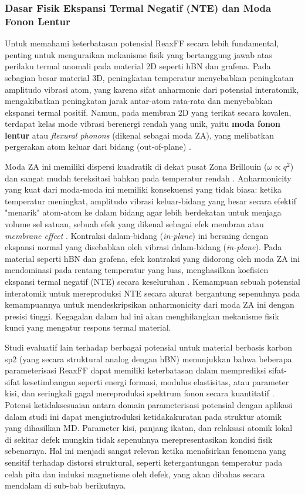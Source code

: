 \subsubsection{Dasar Fisik Ekspansi Termal Negatif (NTE) dan Moda Fonon Lentur}
Untuk memahami keterbatasan potensial ReaxFF secara lebih fundamental, penting untuk menguraikan mekanisme fisik yang bertanggung jawab atas perilaku termal anomali pada material 2D seperti hBN dan grafena. Pada sebagian besar material 3D, peningkatan temperatur menyebabkan peningkatan amplitudo vibrasi atom, yang karena sifat anharmonic dari potensial interatomik, mengakibatkan peningkatan jarak antar-atom rata-rata dan menyebabkan ekspansi termal positif. Namun, pada membran 2D yang terikat secara kovalen, terdapat kelas mode vibrasi berenergi rendah yang unik, yaitu \textbf{moda fonon lentur} atau \textit{flexural phonons} (dikenal sebagai moda ZA), yang melibatkan pergerakan atom keluar dari bidang (out-of-plane) \citep{Sarikurt2022, Mann2017}.

Moda ZA ini memiliki dispersi kuadratik di dekat pusat Zona Brillouin ($\omega \propto q^2$) dan sangat mudah tereksitasi bahkan pada temperatur rendah \citep{CastroNeto2009, Wen2014}. Anharmonicity yang kuat dari moda-moda ini memiliki konsekuensi yang tidak biasa: ketika temperatur meningkat, amplitudo vibrasi keluar-bidang yang besar secara efektif "menarik" atom-atom ke dalam bidang agar lebih berdekatan untuk menjaga volume sel satuan, sebuah efek yang dikenal sebagai efek membran atau \textit{membrane effect} \citep{Mann2017, Yates1972}. Kontraksi dalam-bidang (\textit{in-plane}) ini bersaing dengan ekspansi normal yang disebabkan oleh vibrasi dalam-bidang (\textit{in-plane}). Pada material seperti hBN dan grafena, efek kontraksi yang didorong oleh moda ZA ini mendominasi pada rentang temperatur yang luas, menghasilkan koefisien ekspansi termal negatif (NTE) secara keseluruhan \citep{Du2017, Yoon2011}. Kemampuan sebuah potensial interatomik untuk mereproduksi NTE secara akurat bergantung sepenuhnya pada kemampuannya untuk mendeskripsikan anharmonicity dari moda ZA ini dengan presisi tinggi. Kegagalan dalam hal ini akan menghilangkan mekanisme fisik kunci yang mengatur respons termal material.

Studi evaluatif lain terhadap berbagai potensial untuk material berbasis karbon sp2 (yang secara struktural analog dengan hBN) menunjukkan bahwa beberapa parameterisasi ReaxFF dapat memiliki keterbatasan dalam memprediksi sifat-sifat kesetimbangan seperti energi formasi, modulus elastisitas, atau parameter kisi, dan seringkali gagal mereproduksi spektrum fonon secara kuantitatif \citep{Fthenakis2022, Deringer2020}. Potensi ketidaksesuaian antara domain parameterisasi potensial dengan aplikasi dalam studi ini dapat mengintroduksi ketidakakuratan pada struktur atomik yang dihasilkan MD. Parameter kisi, panjang ikatan, dan relaksasi atomik lokal di sekitar defek mungkin tidak sepenuhnya merepresentasikan kondisi fisik sebenarnya. Hal ini menjadi sangat relevan ketika menafsirkan fenomena yang sensitif terhadap distorsi struktural, seperti ketergantungan temperatur pada celah pita dan induksi magnetisme oleh defek, yang akan dibahas secara mendalam di sub-bab berikutnya.

